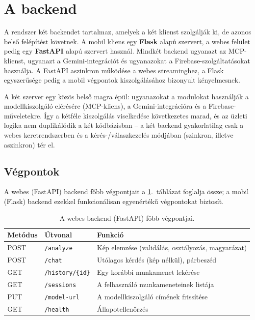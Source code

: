 \section{A backend}

A rendszer két backendet tartalmaz, amelyek a két klienst szolgálják ki, de
azonos belső felépítést követnek. A mobil kliens egy \textbf{Flask}
\cite{flask} alapú szervert, a webes felület pedig egy \textbf{FastAPI}
\cite{fastapi} alapú szervert használ. Mindkét backend ugyanazt az MCP-klienst,
ugyanazt a Gemini-integrációt és ugyanazokat a Firebase-szolgáltatásokat
használja. A FastAPI aszinkron működése a webes streaminghez, a Flask
egyszerűsége pedig a mobil végpontok kiszolgálásához bizonyult kényelmesnek.

A két szerver egy közös belső magra épül: ugyanazokat a modulokat használják a
modellkiszolgáló elérésére (MCP-kliens), a Gemini-integrációra és a
Firebase-műveletekre. Így a kétféle kiszolgálás viselkedése következetes marad,
és az üzleti logika nem duplikálódik a két kódbázisban -- a két backend
gyakorlatilag csak a webes keretrendszerben és a kérés-/válaszkezelés módjában
(szinkron, illetve aszinkron) tér el.

\subsection{Végpontok}

A webes (FastAPI) backend főbb végpontjait a \ref{tab:endpoints}.~táblázat
foglalja össze; a mobil (Flask) backend ezekkel funkcionálisan egyenértékű
végpontokat biztosít.

\begin{table}[H]
  \centering
  \caption{A webes backend (FastAPI) főbb végpontjai.}
  \label{tab:endpoints}
  \begin{tabular}{lll}
    \hline
    \textbf{Metódus} & \textbf{Útvonal} & \textbf{Funkció} \\
    \hline
    POST & \texttt{/analyze}            & Kép elemzése (validálás, osztályozás, magyarázat) \\
    POST & \texttt{/chat}               & Utólagos kérdés (kép nélkül), párbeszéd \\
    GET  & \texttt{/history/\{id\}}     & Egy korábbi munkamenet lekérése \\
    GET  & \texttt{/sessions}           & A felhasználó munkameneteinek listája \\
    PUT  & \texttt{/model-url}          & A modellkiszolgáló címének frissítése \\
    GET  & \texttt{/health}             & Állapotellenőrzés \\
    \hline
  \end{tabular}
\end{table}

